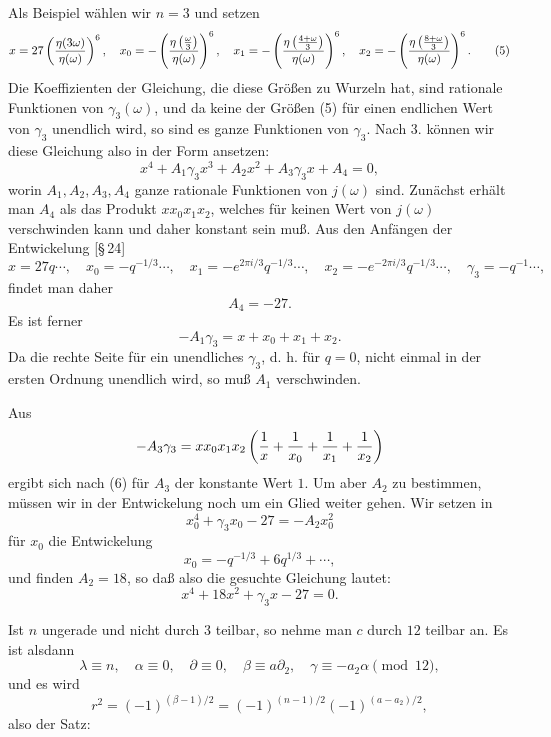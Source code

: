 \documentclass[11pt]{article}
\begin{document}
Als Beispiel wählen wir $n=3$ und setzen
\begin{equation}
 x=27\left({\eta(3\omega)\over\eta(\omega)}\right)^6,
\quad
x_0=-\left({\eta\left({\omega\over3}\right)\over\eta(\omega)}\right)^6,
\quad
x_1=-\left({\eta\left({4+\omega\over3}\right)\over\eta(\omega)}\right)^6,
\quad
x_2=-\left({\eta\left({8+\omega\over3}\right)\over\eta(\omega)}\right)^6.
\tag{5}
\end{equation}
Die Koeffizienten der Gleichung, die diese Größen zu Wurzeln hat, sind rationale Funktionen von $\gamma_3(\omega)$, und da keine der Größen (5) für einen endlichen Wert von $\gamma_3$ unendlich wird, so sind es ganze Funktionen von $\gamma_3$. Nach 3. können wir diese Gleichung also in der Form ansetzen:
\[
 x^4+A_1\gamma_3x^3+A_2x^2+A_3\gamma_3x+A_4=0,
\]
worin $A_1,A_2,A_3,A_4$ ganze rationale Funktionen von $j(\omega)$ sind. Zunächst erhält man $A_4$ als das Produkt $xx_0x_1x_2$, welches für keinen Wert von $j(\omega)$ verschwinden kann und daher konstant sein muß. Aus den Anfängen der Entwickelung [\S\,24]
\begin{equation}
 x=27q\cdots,
 \quad x_0=-q^{-1/3}\cdots,
 \quad x_1=-e^{2\pi i/3}q^{-1/3}\cdots,
 \quad x_2=-e^{-2\pi i/3}q^{-1/3}\cdots,
 \quad \gamma_3=-q^{-1}\cdots,
\tag{6}
\end{equation}
findet man daher
\[
 A_4=-27.
\]
Es ist ferner
\[
 -A_1\gamma_3=x+x_0+x_1+x_2.
\]
Da die rechte Seite für ein unendliches $\gamma_3$, d. h. für $q=0$, nicht einmal in der ersten Ordnung unendlich wird, so muß $A_1$ verschwinden.

Aus
\[
 -A_3\gamma_3=xx_0x_1x_2\left({1\over x}+{1\over x_0}+{1\over x_1}+{1\over x_2}\right)
\]
ergibt sich nach (6) für $A_3$ der konstante Wert $1$. Um aber $A_2$ zu bestimmen, müssen wir in der Entwickelung noch um ein Glied weiter gehen. Wir setzen in
\[
 x_0^4+\gamma_3x_0-27=-A_2x_0^2
\]
für $x_0$ die Entwickelung
\[
 x_0=-q^{-1/3}+6q^{1/3}+\cdots,
\]
und finden $A_2=18$, so daß also die gesuchte Gleichung lautet:
\begin{equation}
 x^4+18x^2+\gamma_3x-27=0.
\tag{7}
\end{equation}

Ist $n$ ungerade und nicht durch $3$ teilbar, so nehme man $c$ durch $12$ teilbar an. Es ist alsdann
\[
 \lambda\equiv n,
 \quad \alpha\equiv0,
 \quad \partial\equiv0,
 \quad \beta\equiv a\partial_2,
 \quad \gamma\equiv-a_2\alpha
 \pmod {12},
\]
und es wird
\[
 r^2=(-1)^{(\beta-1)/2}=(-1)^{(n-1)/2}(-1)^{(a-a_2)/2},
\]
also der Satz:
\end{document}
